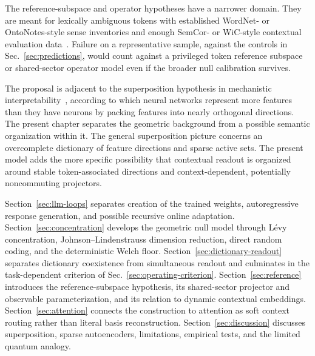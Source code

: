 \documentclass[
  aps,
  reprint,
  superscriptaddress,
  floatfix,
  nofootinbib,
  longbibliography
]{revtex4-2}
\begin{document}
The reference-subspace and operator hypotheses have a narrower domain. They
are meant for lexically ambiguous tokens with established WordNet- or
OntoNotes-style sense inventories and enough SemCor- or WiC-style contextual
evaluation data~\cite{pilehvar2019wic}. Failure on a representative sample,
against the controls in
Sec.~\ref{sec:predictions}, would count against a privileged token reference
subspace or shared-sector operator model even if the broader null calibration
survives.

The proposal is adjacent to the superposition hypothesis in mechanistic
interpretability~\cite{elhage2022superposition}, according to which neural networks
represent more features than they have neurons by packing features into
nearly orthogonal directions. The present chapter separates the
geometric background from a possible semantic organization within it.
The general superposition picture concerns an overcomplete dictionary
of feature directions and sparse active sets. The present model adds the more
specific possibility that contextual readout is organized around stable
token-associated directions and context-dependent, potentially noncommuting
projectors.

Section~\ref{sec:llm-loops} separates creation of the trained weights,
autoregressive response generation, and possible recursive online adaptation.
Section~\ref{sec:concentration} develops the geometric null model through
L\'evy concentration, Johnson--Lindenstrauss dimension reduction, direct
random coding, and the deterministic Welch floor.
Section~\ref{sec:dictionary-readout} separates dictionary coexistence from
simultaneous readout and culminates in the task-dependent criterion of
Sec.~\ref{sec:operating-criterion}. Section~\ref{sec:reference} introduces the
reference-subspace hypothesis, its shared-sector projector and observable
parameterization, and its relation to dynamic contextual embeddings.
Section~\ref{sec:attention} connects the construction to attention as soft
context routing rather than literal basis reconstruction.
Section~\ref{sec:discussion} discusses superposition, sparse
autoencoders, limitations, empirical tests, and the limited quantum
analogy.
\end{document}
